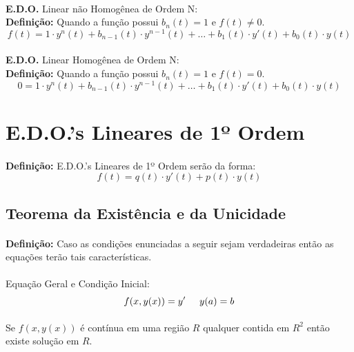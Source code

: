 \documentclass{article}
\begin{document}
        \paragraph{}\textbf{E.D.O.} Linear não Homogênea de Ordem N:\\
        \textbf{Definição:} Quando a função possui $b_{n}(t) = 1$ e $f(t) \neq 0$.
            \[f(t) = 1 \cdot y^{n}(t) + b_{n-1}(t) \cdot y^{n-1}(t) + \dots +b_{1}(t) \cdot y'(t) + b_{0}(t) \cdot y(t)\]
        
        \paragraph{}\textbf{E.D.O.} Linear Homogênea de Ordem N:\\
        \textbf{Definição:} Quando a função possui $b_{n}(t) = 1$ e $f(t) = 0$.
            \[0 = 1 \cdot y^{n}(t) + b_{n-1}(t) \cdot y^{n-1}(t) + \dots +b_{1}(t) \cdot y'(t) + b_{0}(t) \cdot y(t)\]
\newpage

\section{E.D.O.'s Lineares de 1º Ordem}
    \paragraph{}\textbf{Definição:} E.D.O.'s Lineares de 1º Ordem serão da forma:
        \[f(t) = q(t) \cdot y'(t) + p(t) \cdot y(t)\]
    
    \subsection{Teorema da Existência e da Unicidade}
        \paragraph{}\textbf{Definição:} Caso as condições enunciadas a seguir sejam verdadeiras então as equações terão tais características.
        \paragraph{}Equação Geral e Condição Inicial:
            \[f(x,y(x)) = y' \hspace{5mm} y(a) = b\]
        \paragraph{}Se $f(x,y(x))$ é contínua em uma região $R$ qualquer contida em $R^2$ então existe solução em $R$.
\end{document}
